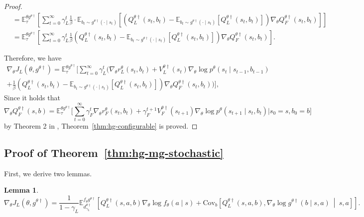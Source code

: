 \documentclass[letterpaper]{article} %
\providecommand{\E}{\mathbb{E}} %
\newtheorem{lemma}{Lemma}
\begin{document}
\begin{proof}
\begin{subequations}
\begin{align}
    &=\E_\tau^{\theta g^{\theta\dagger}}\left[\sum_{t=0}^\infty \gamma_L^t \frac{1}{\beta} 
    \cdot\E_{b_t\sim g^{\theta\dagger}(\cdot\mid s_t)}\left[\left(Q_L^{{\theta}\dagger}(s_t, b_t) - \E_{b_t\sim g^{\theta\dagger}(\cdot\mid s_t)}\left[Q_L^{{\theta}\dagger}(s_t, b_t)\right]\right) \nabla_{\theta}Q_F^{{\theta} \dagger}(s_t, b_t) \right] \right]\\
    &=\E_\tau^{\theta g^{\theta\dagger}}\left[\sum_{t=0}^\infty \gamma_L^t \frac{1}{\beta} \left(Q_L^{{\theta}\dagger}(s_t, b_t) - \E_{b_t\sim g^{\theta\dagger}(\cdot\mid s_t)}\left[Q_L^{{\theta}\dagger}(s_t, b_t)\right]\right) \nabla_{\theta}Q_F^{{\theta} \dagger}(s_t, b_t)\right].
\end{align}
\end{subequations}

Therefore, we have
\begin{multline}
    \nabla_{{\theta}}J_L({\theta}, g^{\theta\dagger})
    =\E_\tau^{\theta g^{\theta\dagger}}\bigg[\sum_{t=0}^\infty \gamma_L^t \bigg(\nabla_{\theta} r_L^{\theta}(s_t, b_t) 
    + V_L^{{\theta}\dagger}(s_t) \nabla_{\theta}\log
    p^{\theta} (s_{t} \mid s_{t-1}, b_{t-1})\\
    + \frac{1}{\beta} \left(Q_L^{{\theta}\dagger}(s_t, b_t) - \E_{b_t\sim g^{\theta\dagger}(\cdot\mid s_t)}\left[Q_L^{{\theta}\dagger}(s_t, b_t)\right]\right) \nabla_{\theta} Q_F^{{\theta} \dagger}(s_t, b_t) \bigg) \bigg],
\end{multline}
Since it holds that
\begin{equation}
\nabla_{{\theta}}Q_F^{{\theta}\dag}(s,b) = \E_\tau^{\theta g^{\theta\dagger}}\bigg[\sum_{t=0}^\infty\gamma_F^t\nabla_{{\theta}}r_F^{{\theta}}(s_t,b_t) 
+ \gamma_F^{t+1}V_F^{{\theta}\dag}(s_{t+1})\nabla_{{\theta}}\log p^{{\theta}}(s_{t+1}\mid s_t,b_t) \bigg|s_0=s,b_0=b\bigg]
\end{equation}
by Theorem 2 in \citet{Thoma2024-em}, Theorem~\ref{thm:hg-configurable} is proved.
\end{proof}

\subsection{Proof of Theorem~\ref{thm:hg-mg-stochastic}}

First, we derive two lemmas.

\begin{lemma}
\begin{equation}
\nabla_{\theta} J_L(\theta, g^{\theta\dagger})=\dfrac{1}{1-\gamma_L}\E_{d_{\gamma_L}^{\theta\dagger}}^{f_{\theta}g^{\theta \dagger}}\left[Q_L^{\theta \dagger}(s,a,b)\nabla_{\theta}\log f_{\theta}(a\mid s)
        +\mathrm{Cov}_{b}\left[Q_L^{\theta \dagger}(s,a,b), \nabla_{\theta}\log g^{\theta \dagger}(b\mid s,a)~\middle|~s,a\right]\right].
\end{equation}
\end{lemma}
\end{document}
